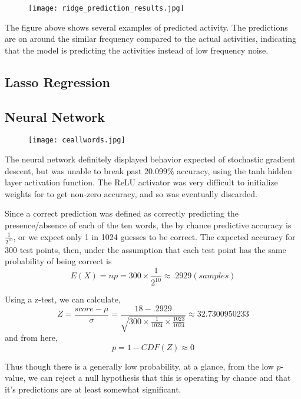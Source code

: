 \begin{figure}[H]
 \centering
 \texttt{[image: ridge\_prediction\_results.jpg]}
  \label{fig:test1}
\end{figure}
The figure above shows several examples of predicted activity. The predictions are on around the similar frequency compared to the actual activities, indicating that the model is predicting the activities instead of low frequency noise.

\subsection{Lasso Regression}

\subsection{Neural Network}
\begin{figure}[H]
 \centering
 \texttt{[image: ceallwords.jpg]}
  \label{fig:test1}
\end{figure}

\par The neural network definitely displayed behavior expected of stochastic gradient descent, but was unable to break past 20.099$\%$ accuracy, using the tanh hidden layer activation function. The ReLU activator was very difficult to initialize weights for to get non-zero accuracy, and so was eventually discarded. 

\par Since a correct prediction was defined as correctly predicting the presence/absence of each of the ten words, the by chance predictive accuracy is $\frac{1}{2^{10}}$, or we expect only 1 in 1024 guesses to be correct. The expected accuracy for 300 test points, then, under the assumption that each test point has the same probability of being correct is 
$$E(X) = np = 300\times \frac{1}{2^{10}} \approx .2929  (samples)$$

\par Using a z-test, we can calculate,
$$ Z = \frac{score - \mu}{\sigma} = \frac{18 - .2929}{\sqrt{300\times \frac{1}{1024} \times \frac{1023}{1024}}} \approx 32.7300950233 $$
and from here, 
$$ p = 1 - CDF(Z) \approx 0$$

Thus though there is a generally low probability, at a glance, from the low $p$-value, we can reject a null hypothesis that this is operating by chance and that it's predictions are at least somewhat significant. 















